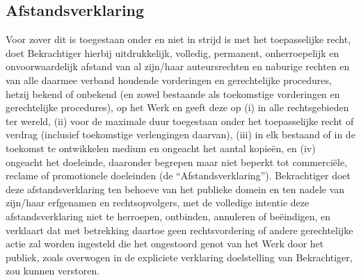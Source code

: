 \documentclass[10pt, a4paper]{article}
\begin{document}
\subsection{Afstandsverklaring}
Voor zover dit is toegestaan onder en niet in strijd is met het toepasselijke recht, doet Bekrachtiger hierbij uitdrukkelijk, volledig, permanent, onherroepelijk en onvoorwaardelijk afstand van al zijn/haar auteursrechten en naburige rechten en van alle daarmee verband houdende vorderingen en gerechtelijke procedures, hetzij bekend of onbekend (en zowel bestaande als toekomstige vorderingen en gerechtelijke procedures), op het Werk en geeft deze op (i) in alle rechtsgebieden ter wereld, (ii) voor de maximale duur toegestaan onder het toepasselijke recht of verdrag (inclusief toekomstige verlengingen daarvan), (iii) in elk bestaand of in de toekomst te ontwikkelen medium en ongeacht het aantal kopieën, en (iv) ongeacht het doeleinde, daaronder begrepen maar niet beperkt tot commerciële, reclame of promotionele doeleinden (de ``Afstandsverklaring'').
Bekrachtiger doet deze afstandsverklaring ten behoeve van het publieke domein en ten nadele van zijn/haar erfgenamen en rechtsopvolgers, met de volledige intentie deze afstandsverklaring niet te herroepen, ontbinden, annuleren of beëindigen, en verklaart dat met betrekking daartoe geen rechtsvordering of andere gerechtelijke actie zal worden ingesteld die het ongestoord genot van het Werk door het publiek, zoals overwogen in de expliciete verklaring doelstelling van Bekrachtiger, zou kunnen verstoren.
\end{document}
